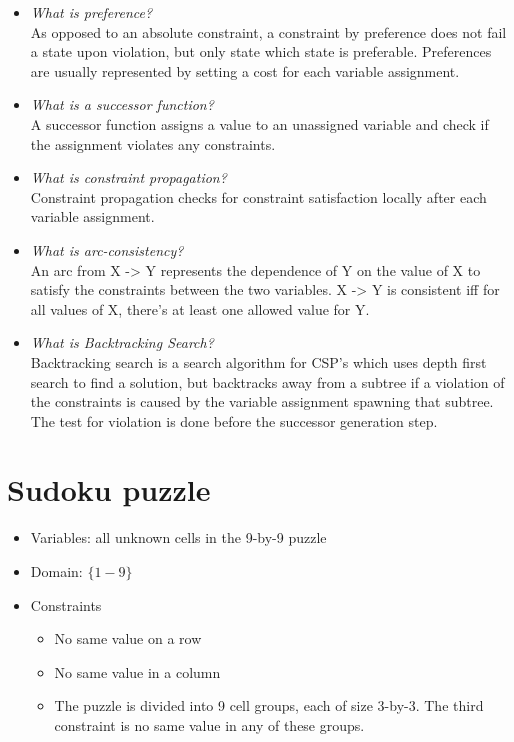 \documentclass[a4paper, 12pt]{article}
\begin{document}
\begin{itemize}
        \item \emph{What is preference?}\\
            As opposed to an absolute constraint, a constraint by preference does
            not fail a state upon violation, but only state which state is
            preferable. Preferences are usually represented by setting a cost
            for each variable assignment.
        \item \emph{What is a successor function?}\\
            A successor function assigns a value to an unassigned variable and
            check if the assignment violates any constraints.
        \item \emph{What is constraint propagation?}\\
            Constraint propagation checks for constraint satisfaction locally
            after each variable assignment.
        \item \emph{What is arc-consistency?}\\
            An arc from X -> Y represents the dependence of Y on the value of X
            to satisfy the constraints between the two variables. X -> Y is
            consistent iff for all values of X, there's at least one allowed
            value for Y.
        \item \emph{What is Backtracking Search?}\\
            Backtracking search is a search algorithm for CSP's which uses depth
            first search to find a solution, but backtracks away from a subtree
            if a violation of the constraints is caused by the variable assignment
            spawning that subtree. The test for violation is done before the
            successor generation step.
    \end{itemize}

\section{Sudoku puzzle}

\begin{itemize}
    \item Variables: all unknown cells in the 9-by-9 puzzle

	\item Domain: $\{1-9\}$

    \item Constraints
    \begin{itemize}
        \item No same value on a row
        \item No same value in a column
        \item The puzzle is divided into 9 cell groups, each of size 3-by-3. The
        third constraint is no same value in any of these groups.
    \end{itemize}
\end{itemize}
\end{document}
